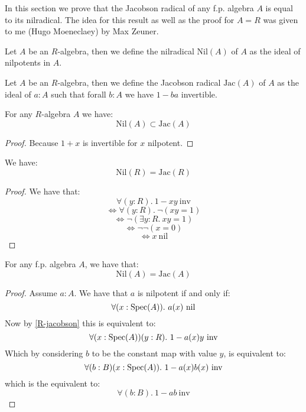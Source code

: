 In this section we prove that the Jacobson radical of any f.p. algebra $A$ is equal to its nilradical. The idea for this result as well as the proof for $A=R$ was given to me (Hugo Moeneclaey) by Max Zeuner.

\begin{definition}
Let $A$ be an $R$-algebra, then we define the nilradical $\mathrm{Nil}(A)$ of $A$ as the ideal of nilpotents in $A$.
\end{definition}

\begin{definition}
Let $A$ be an $R$-algebra, then we define the Jacobson radical $\mathrm{Jac}(A)$ of $A$ as the ideal of $a:A$ such that forall $b:A$ we have $1-ba$ invertible.
\end{definition}

\begin{lemma}\label{nilradical-in-jacobson}
For any $R$-algebra $A$ we have:
\[\mathrm{Nil}(A) \subset \mathrm{Jac}(A)\]
\end{lemma}

\begin{proof}
Because $1+x$ is invertible for $x$ nilpotent.
\end{proof}

\begin{lemma}\label{R-jacobson}
We have:
\[\mathrm{Nil}(R) = \mathrm{Jac}(R)\]
\end{lemma}

\begin{proof}
We have that:
\[\forall (y:R).\ 1-xy\ \mathrm{inv}\]
\[\Leftrightarrow \forall (y:R).\ \neg(xy = 1) \]
\[\Leftrightarrow \neg (\exists y:R.\ xy=1) \]
\[\Leftrightarrow \neg\neg (x=0) \]
\[\Leftrightarrow x\ \mathrm{nil} \]
\end{proof}

\begin{proposition}
For any f.p. algebra $A$, we have that:
\[\mathrm{Nil}(A) = \mathrm{Jac}(A)\]
\end{proposition}

\begin{proof}
Assume $a:A$. We have that $a$ is nilpotent if and only if:
\[\forall (x:\operatorname{Spec}(A)).\ a(x)\ \mathrm{nil}\]
Now by \cref{R-jacobson} this is equivalent to:
\[ \forall (x:\operatorname{Spec}(A))(y:R).\ 1 - a(x)y\ \mathrm{inv}\]
Which by considering $b$ to be the constant map with value $y$, is equivalent to:
\[ \forall (b:B)(x:\operatorname{Spec}(A)).\ 1 - a(x)b(x)\ \mathrm{inv}\]
which is the equivalent to:
\[\forall (b:B).\ 1 - ab\ \mathrm{inv}\]
\end{proof}
